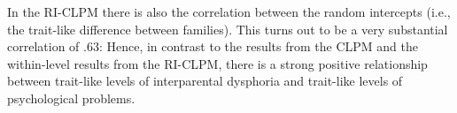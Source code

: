 \documentclass[
]{book}
\begin{document}
In the RI-CLPM there is also the correlation between the random intercepts (i.e., the trait-like difference between families). This turns out to be a very substantial correlation of .63: Hence, in contrast to the results from the CLPM and the within-level results from the RI-CLPM, there is a strong positive relationship between trait-like levels of interparental dysphoria and trait-like levels of psychological problems.
\end{document}
